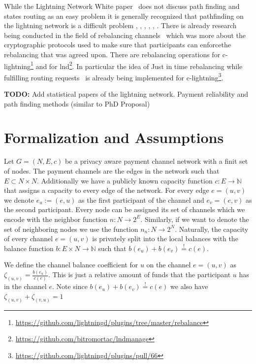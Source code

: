 \documentclass[a4paper]{paper}
\begin{document}
While the Lightning Network White paper~\cite{poon2016bitcoin} does not discuss path finding and states routing as an easy problem it is generally recognized that pathfinding on the lightning network is a difficult problem \cite{piatkivskyi2018split}, \cite{prihodko2016flare}, \cite{bagaria2019boomerang}, \cite{pickhardt2019pathfinding}, \cite{grunspan2018ant}, \cite{sivaraman2018routing}.
There is already research being conducted in the field of rebalancing channels~\cite{khalil2017revive} which was more about the cryptographic protocols used to make sure that participants can enforcethe rebalancing that was agreed upon.
There are rebalancing operations for c-lightning\footnote{\url{https://github.com/lightningd/plugins/tree/master/rebalance}} and for lnd\footnote{\url{https://github.com/bitromortac/lndmanage}}.
In particular the idea of Just in time rebalancing while fulfilling routing requests~\cite{pickhardt2019jit} is already being implemented for c-lightning\footnote{\url{https://github.com/lightningd/plugins/pull/66}}. 

\textbf{TODO:} Add statistical papers of the lightning network. Payment reliability and path finding methods (similar to PhD Proposal)


\section{Formalization and Assumptions}
\label{sec:formalization}

Let $G=(N,E,c)$ be a privacy aware payment channel network with a finit set of nodes.
The payment channels are the edges in the network such that $E\subset N\times N$.
Additionally we have a publicly known capacity function $c: E\longrightarrow \mathbb{N}$ that assigns a capacity to every edge of the network.
For every edge $e=(u,v)$ we denote $e_u:=(e,u)$ as the first participant of the channel and $e_v=(e,v)$ as the second participant.
Every node can be assigned its set of channels which we encode with the neighbor function $n : N \longrightarrow 2^{E}$.
Similarly, if we want to denote the set of neighboring nodes we use the function $n_n : N \longrightarrow 2^{N}$.
Naturally, the capacity of every channel $e=(u,v)$ is privately split into the local balances with the balance function $b: E\times N\longrightarrow\mathbb{N}$ such that $b(e_u)+b(e_v)\stackrel{!}{=}c(e)$.

We define the channel balance coefficient for $u$ on the channel $e=(u,v)$ as  $\zeta_{(u,v)} = \frac{b(e_u)}{c(e)}$.
This is just a relative amount of funds that the participant $u$ has in the channel $e$.
Note since $b(e_u)+b(e_v)\stackrel{!}{=}c(e)$ we also have $\zeta_{(u,v)} + \zeta_{(v,u)}=1$
\end{document}
